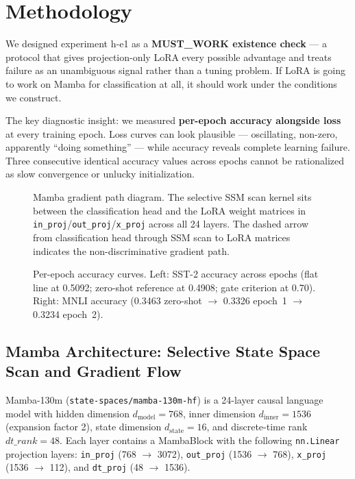 \section{Methodology}
\label{sec:methodology}

We designed experiment h-e1 as a \textbf{MUST\_WORK existence check} --- a protocol that gives projection-only LoRA every possible advantage and treats failure as an unambiguous signal rather than a tuning problem. If LoRA is going to work on Mamba for classification at all, it should work under the conditions we construct.

The key diagnostic insight: we measured \textbf{per-epoch accuracy alongside loss} at every training epoch. Loss curves can look plausible --- oscillating, non-zero, apparently ``doing something'' --- while accuracy reveals complete learning failure. Three consecutive identical accuracy values across epochs cannot be rationalized as slow convergence or unlucky initialization.

\begin{figure}[t]
\centering
\caption{Mamba gradient path diagram. The selective SSM scan kernel sits between the classification head and the LoRA weight matrices in \texttt{in\_proj}/\texttt{out\_proj}/\texttt{x\_proj} across all 24 layers. The dashed arrow from classification head through SSM scan to LoRA matrices indicates the non-discriminative gradient path.}
\label{fig:gradient_path}
\end{figure}

\begin{figure}[t]
\centering
\caption{Per-epoch accuracy curves. Left: SST-2 accuracy across epochs (flat line at 0.5092; zero-shot reference at 0.4908; gate criterion at 0.70). Right: MNLI accuracy (0.3463 zero-shot $\to$ 0.3326 epoch~1 $\to$ 0.3234 epoch~2).}
\label{fig:accuracy_curves}
\end{figure}

\subsection{Mamba Architecture: Selective State Space Scan and Gradient Flow}

Mamba-130m (\texttt{state-spaces/mamba-130m-hf}) is a 24-layer causal language model with hidden dimension $d_\text{model} = 768$, inner dimension $d_\text{inner} = 1536$ (expansion factor 2), state dimension $d_\text{state} = 16$, and discrete-time rank $dt\_rank = 48$. Each layer contains a MambaBlock with the following \texttt{nn.Linear} projection layers: \texttt{in\_proj} (768 $\to$ 3072), \texttt{out\_proj} (1536 $\to$ 768), \texttt{x\_proj} (1536 $\to$ 112), and \texttt{dt\_proj} (48 $\to$ 1536).


